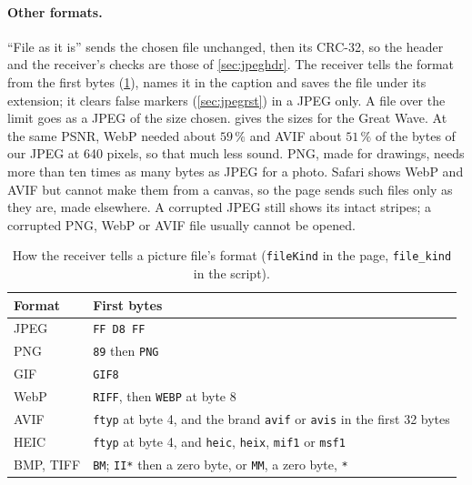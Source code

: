 \documentclass[11pt,a4paper]{article}
\newcommand{\code}[1]{\texttt{#1}}
\theoremstyle{remark}
\begin{document}
\paragraph{Other formats.}
``File as it is'' sends the chosen file unchanged, then its CRC-32, so the header and the receiver's checks are those of \cref{sec:jpeghdr}.
The receiver tells the format from the first bytes (\cref{tab:magic}), names it in the caption and saves the file under its extension; it clears false markers (\cref{sec:jpegrst}) in a JPEG only.
A file over the limit goes as a JPEG of the size chosen.
 gives the sizes for the Great Wave. At the same PSNR, WebP needed about $59\,\%$ and AVIF about $51\,\%$ of the bytes of our JPEG at 640 pixels, so that much less sound. PNG, made for drawings, needs more than ten times as many bytes as JPEG for a photo.
Safari shows WebP and AVIF but cannot make them from a canvas, so the page sends such files only as they are, made elsewhere.
A corrupted JPEG still shows its intact stripes; a corrupted PNG, WebP or AVIF file usually cannot be opened.

\begin{table}[ht]
\centering
\caption{How the receiver tells a picture file's format (\code{fileKind} in the page, \code{file\_kind} in the script).}
\label{tab:magic}
\small
\begin{tabular}{ll}
\toprule
Format & First bytes\\
\midrule
JPEG & \code{FF D8 FF}\\
PNG & \code{89} then \code{PNG}\\
GIF & \code{GIF8}\\
WebP & \code{RIFF}, then \code{WEBP} at byte 8\\
AVIF & \code{ftyp} at byte 4, and the brand \code{avif} or \code{avis} in the first 32 bytes\\
HEIC & \code{ftyp} at byte 4, and \code{heic}, \code{heix}, \code{mif1} or \code{msf1}\\
BMP, TIFF & \code{BM}; \code{II*} then a zero byte, or \code{MM}, a zero byte, \code{*}\\
\bottomrule
\end{tabular}
\end{table}
\end{document}
